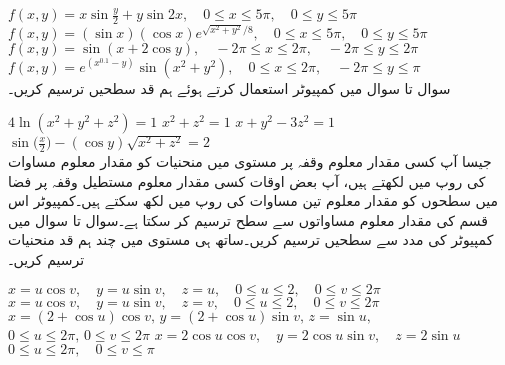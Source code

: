 $f(x,y)=x\sin\tfrac{y}{2}+y\sin 2x,\quad 0\le x\le 5\pi,\quad 0\le y\le 5\pi$
$f(x,y)=(\sin x)(\cos x)e^{\sqrt{x^2+y^2}/8},\quad 0\le x\le 5\pi,\quad 0\le y\le 5\pi$
$f(x,y)=\sin(x+2\cos y),\quad -2\pi\le x\le 2\pi,\quad -2\pi\le y\le 2\pi$
$f(x,y)=e^{(x^{0.1}-y)}\sin (x^2+y^2),\quad 0\le x\le 2\pi,\quad -2\pi\le y\le \pi$
\\
سوال  تا سوال  میں کمپیوٹر استعمال کرتے ہوئے ہم قد سطحیں  ترسیم کریں۔

$4\ln(x^2+y^2+z^2)=1$
$x^2+z^2=1$
$x+y^2-3z^2=1$
$\sin\big(\frac{x}{2}\big)-(\cos y)\sqrt{x^2+z^2}=2$
\\
جیسا آپ کسی مقدار معلوم وقفہ  پر  مستوی میں منحنیات کو مقدار معلوم مساوات  کی    روپ میں لکھتے ہیں، آپ بعض اوقات کسی مقدار معلوم مستطیل وقفہ  پر  فضا میں سطحوں کو    مقدار معلوم تین مساوات   کی روپ میں لکھ سکتے ہیں۔کمپیوٹر اس قسم کی مقدار معلوم مساواتوں سے سطح  ترسیم کر سکتا ہے۔سوال  تا سوال  میں کمپیوٹر کی مدد سے سطحیں ترسیم کریں۔ساتھ ہی  مستوی میں چند ہم قد منحنیات ترسیم کریں۔

$x=u\cos v,\quad y=u\sin v,\quad z=u,\quad 0\le u\le 2,\quad 0\le v\le 2\pi$
$x=u\cos v,\quad y=u\sin v,\quad z=v,\quad 0\le u\le 2,\quad 0\le v\le 2\pi$
$x=(2+\cos u)\cos v,\,y=(2+\cos u)\sin v,\, z=\sin u,$\\
$ 0\le u\le 2\pi,\, 0\le v\le 2\pi$
$x=2\cos u\cos v,\quad y=2\cos u\sin v,\quad z=2\sin u$\\
$0\le u\le 2\pi,\quad 0\le v\le \pi$





